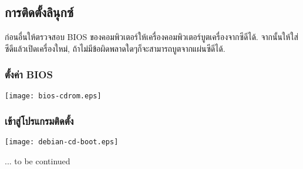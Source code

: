 \begin{thwbr}
\section{การติดตั้งลินุกซ์}
ก่อนอื่นให้ตรวจสอบ BIOS ของคอมพิวเตอร์ให้เครื่องคอมพิวเตอร์บูตเครื่องจากซีดีได้. จากนั้นให้ใส่ซีดีแล้วเปิดเครื่องใหม่, ถ้าไม่มีข้อผิดพลาดใดๆก็จะสามารถบูตจากแผ่นซีดีได้.

\subsubsection*{ตั้งค่า BIOS}
\bigskip
\texttt{[image: bios-cdrom.eps]}

\vfill



\subsubsection*{เข้าสู่โปรแกรมติดตั้ง}%
%

\bigskip
\texttt{[image: debian-cd-boot.eps]}

\vfill

... to be continued


\end{thwbr}
\wbrin

